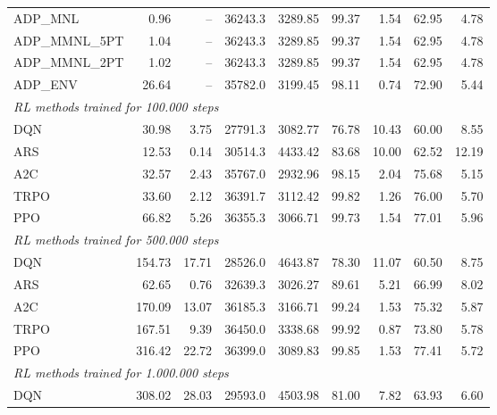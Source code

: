 \begin{samepage}
\begin{center}
\begin{tabular}{l|rr|rr|rr|rr}
    ADP\_MNL     &     0.96 &    -- &    36243.3 &    3289.85 &   99.37 &    1.54 &   62.95 &    4.78 \\
    ADP\_MMNL\_5PT &     1.04 &    -- &    36243.3 &    3289.85 &   99.37 &    1.54 &   62.95 &    4.78 \\
    ADP\_MMNL\_2PT &     1.02 &    -- &    36243.3 &    3289.85 &   99.37 &    1.54 &   62.95 &    4.78 \\
    ADP\_ENV     &    26.64 &    -- &    35782.0 &    3199.45 &   98.11 &    0.74 &   72.90 &    5.44 \\
    \midrule
    \multicolumn{9}{l}{\textit{RL methods trained for 100.000 steps}} \\
    \midrule
    DQN          &    30.98 &     3.75 &    27791.3 &    3082.77 &   76.78 &   10.43 &   60.00 &    8.55 \\
    ARS          &    12.53 &     0.14 &    30514.3 &    4433.42 &   83.68 &   10.00 &   62.52 &   12.19 \\
    A2C          &    32.57 &     2.43 &    35767.0 &    2932.96 &   98.15 &    2.04 &   75.68 &    5.15 \\
    TRPO         &    33.60 &     2.12 &    36391.7 &    3112.42 &   99.82 &    1.26 &   76.00 &    5.70 \\
    PPO          &    66.82 &     5.26 &    36355.3 &    3066.71 &   99.73 &    1.54 &   77.01 &    5.96 \\
    \midrule
    \multicolumn{9}{l}{\textit{RL methods trained for 500.000 steps}} \\
    \midrule
    DQN          &   154.73 &    17.71 &    28526.0 &    4643.87 &   78.30 &   11.07 &   60.50 &    8.75 \\
    ARS          &    62.65 &     0.76 &    32639.3 &    3026.27 &   89.61 &    5.21 &   66.99 &    8.02 \\
    A2C          &   170.09 &    13.07 &    36185.3 &    3166.71 &   99.24 &    1.53 &   75.32 &    5.87 \\
    TRPO         &   167.51 &     9.39 &    36450.0 &    3338.68 &   99.92 &    0.87 &   73.80 &    5.78 \\
    PPO          &   316.42 &    22.72 &    36399.0 &    3089.83 &   99.85 &    1.53 &   77.41 &    5.72 \\
    \midrule
    \multicolumn{9}{l}{\textit{RL methods trained for 1.000.000 steps}} \\
    \midrule
    DQN          &   308.02 &    28.03 &    29593.0 &    4503.98 &   81.00 &    7.82 &   63.93 &    6.60 \\

\end{tabular}
\end{center}
\end{samepage}
